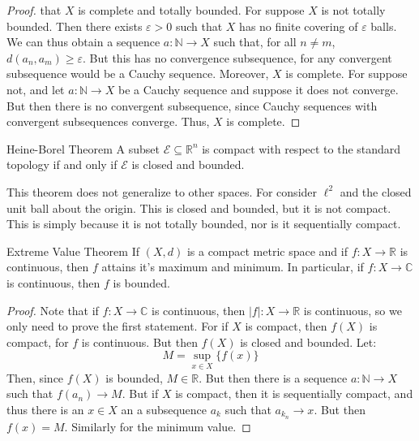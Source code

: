 \documentclass[crop=false,class=article,oneside]{standalone}
\begin{document}
\begin{proof}
                that $X$ is complete and totally bounded. For
                suppose $X$ is not totally bounded. Then there exists
                $\varepsilon>0$ such that $X$ has no finite covering of
                $\varepsilon$ balls. We can thus obtain a sequence
                $a:\mathbb{N}\rightarrow{X}$ such that, for all
                $n\ne{m}$, $d(a_{n},a_{m})\geq\varepsilon$. But this
                has no convergence subsequence, for any convergent
                subsequence would be a Cauchy sequence. Moreover,
                $X$ is complete. For suppose not, and let
                $a:\mathbb{N}\rightarrow{X}$ be a Cauchy sequence and
                suppose it does not converge. But then there is no
                convergent subsequence, since Cauchy sequences with
                convergent subsequences converge. Thus, $X$ is complete.
            \end{proof}
            \begin{ltheorem}{Heine-Borel Theorem}
                A subset $\mathcal{E}\subseteq\mathbb{R}^{n}$ is
                compact with respect to the standard topology if and
                only if $\mathcal{E}$ is closed and bounded.
            \end{ltheorem}
            This theorem does not generalize to other spaces. For
            consider $\ell^{2}$ and the closed unit ball about the
            origin. This is closed and bounded, but it is not compact.
            This is simply because it is not totally bounded, nor is it
            sequentially compact.
            \begin{ltheorem}{Extreme Value Theorem}
                If $(X,d)$ is a compact metric space and if
                $f:X\rightarrow\mathbb{R}$ is continuous, then
                $f$ attains it's maximum and minimum. In particular,
                if $f:X\rightarrow\mathbb{C}$ is continuous, then
                $f$ is bounded.
            \end{ltheorem}
            \begin{proof}
                Note that if $f:X\rightarrow\mathbb{C}$ is continuous,
                then $|f|:X\rightarrow\mathbb{R}$ is continuous, so
                we only need to prove the first statement. For if
                $X$ is compact, then $f(X)$ is compact, for $f$ is
                continuous. But then $f(X)$ is closed and bounded.
                Let:
                \begin{equation}
                    M=\underset{x\in{X}}\sup\{f(x)\}
                \end{equation}
                Then, since $f(X)$ is bounded, $M\in\mathbb{R}$. But
                then there is a sequence $a:\mathbb{N}\rightarrow{X}$
                such that $f(a_{n})\rightarrow{M}$. But if $X$ is
                compact, then it is sequentially compact, and thus
                there is an $x\in{X}$ an a subsequence $a_{k}$ such
                that $a_{k_{n}}\rightarrow{x}$. But then
                $f(x)=M$. Similarly for the minimum value.
            \end{proof}
\end{document}
